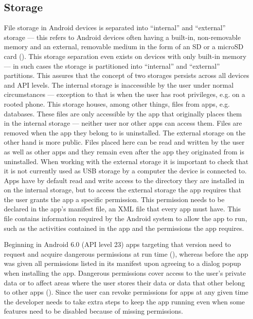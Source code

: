 \subsection{Storage}
\label{android_storage}
File storage in Android devices is separated into ``internal'' and ``external'' storage --- this refers to Android devices often having a built-in, non-removable memory and an external, removable medium in the form of an SD or a microSD card (\cite{android_storage}). This storage separation even exists on devices with only built-in memory --- in such cases the storage is partitioned into ``internal'' and ``external'' partitions. This assures that the concept of two storages persists across all devices and \gls{API} levels. The internal storage is inaccessible by the user under normal circumstances --- exception to that is when the user has root privileges, e.g. on a rooted phone. This storage houses, among other things, files from apps, e.g. databases. These files are only accessible by the app that originally places them in the internal storage --- neither user nor other apps can access them. Files are removed when the app they belong to is uninstalled. 
The external storage on the other hand is more public. Files placed here can be read and written by the user as well as other apps and they remain even after the app they originated from is uninstalled. When working with the external storage it is important to check that it is not currently used as \gls{USB} storage by a computer the device is connected to.
Apps have by default read and write access to the directory they are installed in on the internal storage, but to access the external storage the app requires that the user grants the app a specific permission. This permission needs to be declared in the app's manifest file, an \gls{XML} file that every app must have. This file contains information required by the Android system to allow the app to run, such as the activities contained in the app and the permissions the app requires.

Beginning in Android 6.0 (\gls{API} level 23) apps targeting that version need to request and acquire dangerous permissions at run time (\cite{android_permissions}), whereas before the app was given all permissions listed in its manifest upon agreeing to a dialog popup when installing the app. Dangerous permissions cover access to the user's private data or to affect areas where the user stores their data or data that other belong to other apps (\cite{android_permissions}). Since the user can revoke permissions for apps at any given time the developer needs to take extra steps to keep the app running even when some features need to be disabled because of missing permissions.  
